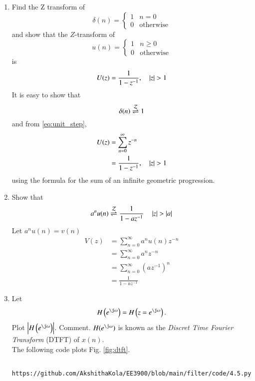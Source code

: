 \documentclass[journal,12pt,twocolumn]{IEEEtran}
\renewcommand\thesection{\arabic{section}}
\begin{document}
\begin{enumerate}[label=\thesection.\arabic*,ref=\thesection.\theenumi]
\item Find the Z transform of 
\begin{equation}
\delta(n)
=
\begin{cases}
1 & n = 0
\\
0 & \text{otherwise}
\end{cases}
\end{equation}
and show that the $Z$-transform of
\begin{equation}
\label{eq:unit_step}
u(n)
=
\begin{cases}
1 & n \ge 0
\\
0 & \text{otherwise}
\end{cases}
\end{equation}
is
\begin{equation}
U(z) = \frac{1}{1-z^{-1}}, \quad \left\vert z\right\vert > 1
\end{equation}
\solution It is easy to show that
\begin{equation}
\delta(n) \overset{\mathcal{Z}}{ \rightleftharpoons} 1
\end{equation}
and from \eqref{eq:unit_step},
\begin{align}
U(z) &= \sum _{n= 0}^{\infty}z^{-n}
\\
&=\frac{1}{1-z^{-1}}, \quad \left\vert z\right\vert > 1
\end{align}
using the formula for the sum of an infinite geometric progression.

\item Show that 
\begin{equation}
\label{eq:anun}
a^nu(n) \overset{\mathcal{Z}}{ \rightleftharpoons} \frac{1}{1-az^{-1}} \quad \left\vert z\right\vert > \left\vert a\right\vert
\end{equation}
\solution Let $a^nu(n) = v(n)$
\begin{align}
     V(z) &= \sum _{n= 0}^{\infty}a^nu(n)z^{-n}\\
     &= \sum _{n= 0}^{\infty}a^nz^{-n}\\
     &= \sum _{n= 0}^{\infty}(az^{-1})^{n}\\
     &= \frac{1}{1-az^{-1}} 
\end{align}
%
\item 
Let
\begin{equation}
   H\brak{e^{\j \omega}} = H\brak{z = e^{\j \omega}}.
\end{equation}
Plot $\abs{H\brak{e^{\j \omega}}}$.  Comment.  $H(e^{\j \omega})$ is
known as the {\em Discret Time Fourier Transform} (DTFT) of $x(n)$.
\\
\solution The following code plots Fig. \ref{fig:dtft}.
\begin{lstlisting}
	https://github.com/AkshithaKola/EE3900/blob/main/filter/code/4.5.py
\end{lstlisting}


\end{enumerate}
\end{document}

